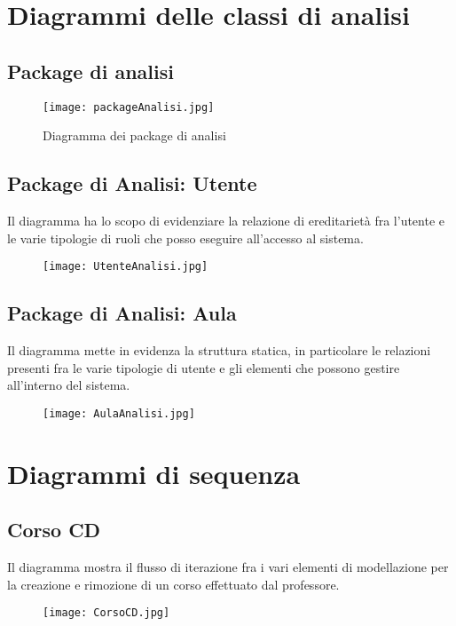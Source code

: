 \documentclass[11pt,a4paper]{report}
\begin{document}
\section{Diagrammi delle classi di analisi}
\subsection{Package di analisi}

\begin{figure}[htbp]
    \centering
    \texttt{[image: packageAnalisi.jpg]} %
    \caption{Diagramma dei package di analisi}
    \label{fig:etichetta}
\end{figure}
\newpage

\subsection{Package di Analisi: Utente}
Il diagramma ha lo scopo di evidenziare la relazione di ereditarietà fra l'utente e le varie tipologie di ruoli che posso eseguire all'accesso al sistema. 
\begin{figure}[htbp]
    \centering
    \texttt{[image: UtenteAnalisi.jpg]} %
\end{figure}
\newpage

\subsection{Package di Analisi: Aula}
Il diagramma mette in evidenza la struttura statica, in particolare le relazioni presenti fra le varie tipologie di utente e gli elementi che possono gestire all'interno del sistema. 
\begin{figure}[htbp]
    \centering
    \texttt{[image: AulaAnalisi.jpg]} %
\end{figure}
\newpage

\section{Diagrammi di sequenza}
\subsection{Corso CD}
Il diagramma mostra il flusso di iterazione fra i vari elementi di modellazione per la creazione e rimozione di un corso effettuato dal professore. 
\begin{figure}[htbp]
    \centering
    \texttt{[image: CorsoCD.jpg]} %
\end{figure}
\newpage
\end{document}
